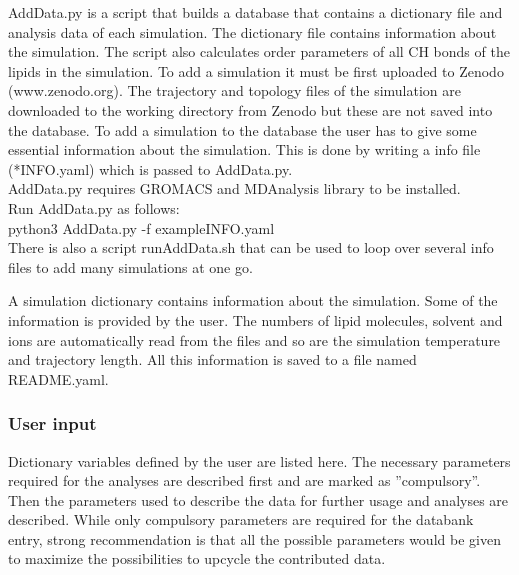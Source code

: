 \documentclass[fleqn,10pt]{wlscirep}
\begin{document}
AddData.py is a script that builds a database that contains a dictionary file and analysis data of each simulation. The dictionary file contains information about the simulation. The script also calculates order parameters of all CH bonds of the lipids in the simulation. To add a simulation it must be first uploaded to Zenodo (www.zenodo.org). The trajectory and topology files of the simulation are downloaded to the working directory from Zenodo but these are not saved into the database. To add a simulation to the database the user has to give some essential information about the simulation. This is done by writing a info file (*INFO.yaml) which is passed to AddData.py. 
\newline \\
AddData.py requires GROMACS and MDAnalysis library to be installed.
\newline \\
Run AddData.py as follows:
\newline \\
python3 AddData.py -f exampleINFO.yaml
\newline \\
There is also a script runAddData.sh that can be used to loop over several info files to add many simulations at one go.

A simulation dictionary contains information about the simulation. Some of the information is provided by the user. The numbers of lipid molecules, solvent and ions are automatically read from the files and so are the simulation temperature and trajectory length. All this information is saved to a file named README.yaml.


\subsubsection{User input}
Dictionary variables defined by the user are listed here. 
The necessary parameters required for the analyses are described first and are marked as ''compulsory''. Then the parameters used to describe the data for further usage and analyses are described.
While only compulsory parameters are required for the databank entry, strong recommendation is that all the possible parameters would be given to maximize the possibilities to upcycle the contributed data. 
\end{document}
